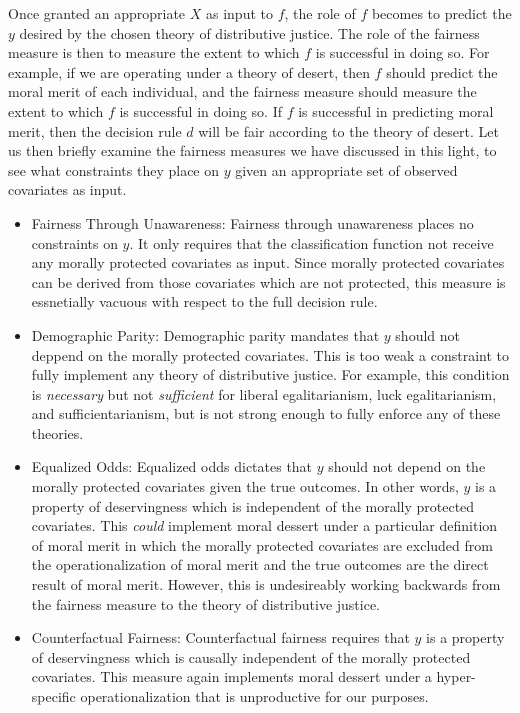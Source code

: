 Once granted an appropriate $X$ as input to $f$, the role of $f$ becomes to
predict the $y$ desired by the chosen theory of distributive justice. The role
of the fairness measure is then to measure the extent to which $f$ is successful
in doing so. For example, if we are operating under a theory of desert, then
$f$ should predict the moral merit of each individual, and the fairness measure
should measure the extent to which $f$ is successful in doing so. If $f$ is
successful in predicting moral merit, then the decision rule $d$ will be fair
according to the theory of desert. Let us then briefly examine the fairness
measures we have discussed in this light, to see what constraints they place on
$y$ given an appropriate set of observed covariates as input.

\begin{itemize}
    \item Fairness Through Unawareness: Fairness through unawareness places no
        constraints on $y$. It only requires that the classification function
        not receive any morally protected covariates as input. Since morally
        protected covariates can be derived from those covariates which are not
        protected, this measure is essnetially vacuous with respect to the full
        decision rule.
    \item Demographic Parity: Demographic parity mandates that $y$ should not
        deppend on the morally protected covariates. This is too weak a
        constraint to fully implement any theory of distributive justice. For
        example, this condition is \textit{necessary} but not
        \textit{sufficient} for liberal egalitarianism, luck egalitarianism, and
        sufficientarianism, but is not strong enough to fully enforce any of
        these theories.
    \item Equalized Odds: Equalized odds dictates that $y$ should not depend on
        the morally protected covariates given the true outcomes. In other
        words, $y$ is a property of deservingness which is independent of the
        morally protected covariates. This \textit{could} implement moral
        dessert under a particular definition of moral merit in which the
        morally protected covariates are excluded from the operationalization of
        moral merit and the true outcomes are the direct result of moral merit.
        However, this is undesireably working backwards from the fairness
        measure to the theory of distributive justice.
    \item Counterfactual Fairness: Counterfactual fairness requires that $y$ is
        a property of deservingness which is causally independent of the
        morally protected covariates. This measure again implements moral
        dessert under a hyper-specific operationalization that is unproductive
        for our purposes.
\end{itemize}

